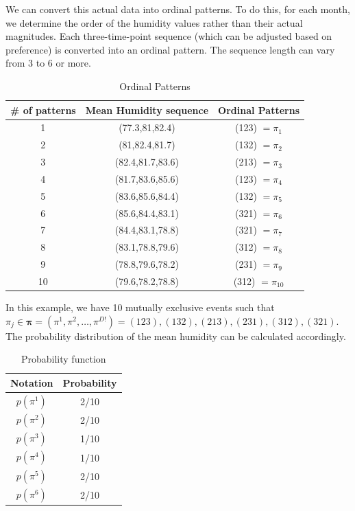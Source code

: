 We can convert this actual data into ordinal patterns. To do this, for each month, we determine the order of the humidity values rather than their actual magnitudes. Each three-time-point sequence (which can be adjusted based on preference) is converted into an ordinal pattern. The sequence length can vary from 3 to 6 or more.

\begin{table}[ht]
	\caption{Ordinal Patterns} %
	\centering %
	\begin{tabular}{c c	c } %
		\hline\hline %
		\# of patterns & Mean Humidity sequence & Ordinal Patterns \\ [0.5ex] %
		\hline %
		1 & (77.3,81,82.4) & (123) $=\pi_1$\\ 
		2 & (81,82.4,81.7) & (132) $=\pi_2$\\
		3 & (82.4,81.7,83.6) & (213) $=\pi_3$\\
		4 & (81.7,83.6,85.6) & (123) $=\pi_4$ \\
		5 & (83.6,85.6,84.4) & (132) $=\pi_5$\\ 
		6 & (85.6,84.4,83.1) & (321) $=\pi_6$\\
		7 & (84.4,83.1,78.8) & (321) $=\pi_7$\\
		8 & (83.1,78.8,79.6) & (312) $=\pi_8$\\ 
		9 & (78.8,79.6,78.2) & (231) $=\pi_9$\\
		10 & (79.6,78.2,78.8) & (312) $=\pi_{10}$\\ [1ex] %
		\hline %
	\end{tabular}
	\label{table:nonlin} %
\end{table}

In this example, we have 10 mutually exclusive events such that $\pi_j \in \mathbf{{\pi}}=({\pi}^1, {\pi}^2,\dots, {\pi}^{D!})= {(123),(132),(213),(231),(312),(321)}$. The probability distribution of the mean humidity can be calculated accordingly.

\begin{table}[ht]
	\caption{Probability function} %
	\centering %
	\begin{tabular}{c c	} %
		\hline\hline %
		Notation & Probability \\ [0.5ex] %
		\hline %
		$p(\pi^1)$ & 2/10 \\ 
		$p(\pi^2)$ & 2/10 \\
		$p(\pi^3)$ & 1/10 \\
		$p(\pi^4)$ & 1/10 \\
		$p(\pi^5)$ & 2/10 \\ 
		$p(\pi^6)$ & 2/10 \\[1ex] %
		\hline %
	\end{tabular}
	\label{table:nonlin} %
\end{table}


